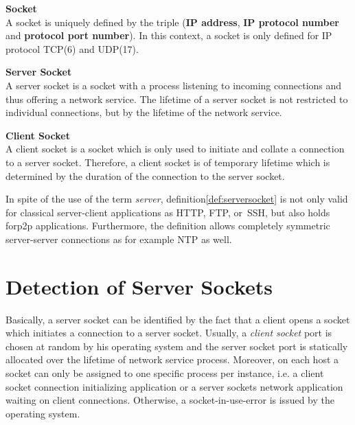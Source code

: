 \parbox{
\textwidth}{
\begin{defn}
	{\textbf{Socket}\\} A socket is uniquely defined by the triple (\textbf{IP address}, \textbf{IP protocol number} and \textbf{protocol port number}). In this context, a socket is only defined for IP protocol \gls{TCP}(6) and \gls{UDP}(17).
\end{defn}
}
\parbox{
\textwidth}{
\begin{defn}
	{\textbf{Server Socket
	\label{def:serversocket}}\\} A server socket is a socket with a process listening to incoming connections and thus offering a network service. The lifetime of a server socket is not restricted to individual connections, but by the lifetime of the network service.
\end{defn}
}

\parbox{
\textwidth}{
\begin{defn}
	{\textbf{Client Socket}\\} A client socket is a socket which is only used to initiate and collate a connection to a server socket. Therefore, a client	socket is of temporary lifetime which is determined by the duration of the 	connection to the server socket.
\end{defn}
}

In spite of the use of the term \emph{server}, definition\ref{def:serversocket} is not only valid for classical server-client applications as \gls{HTTP}, \gls{FTP}, or \gls{SSH}, but also holds for\gls{p2p} applications. Furthermore, the definition allows completely symmetric server-server connections as for example \gls{NTP} as well.


\section{Detection of Server Sockets
\label{section:socket_detection}}

Basically, a \gls{server socket} can be identified by the fact that a client opens a socket which initiates a connection to a \gls{server socket}. Usually, a \emph{client socket} port is chosen at random by his operating system and the \gls{server socket} port is statically allocated over the lifetime of network service process. Moreover, on each host a socket can only be assigned to one specific process per instance, i.e. a client socket connection initializing application or a \glspl{server socket} network application waiting on client connections. Otherwise, a socket-in-use-error is issued by the operating system\citep{Schatzmann:Dissection}.

